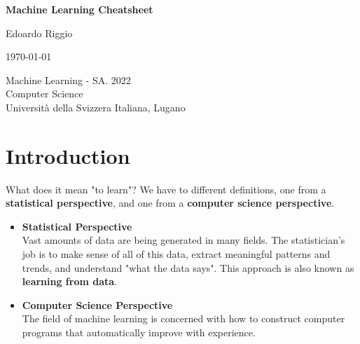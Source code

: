 \documentclass{article}
\begin{document}
\begin{titlepage}
    \begin{center}
        \vspace*{1cm}
        
        \Huge
        \textbf{Machine Learning Cheatsheet}
        
        \vspace{0.5cm}
        \LARGE
        
        \vspace{.5cm}
        
        Edoardo Riggio
   		  \vspace{1.5cm}
       
        \vfill
        
        \today
        
        \vspace{.8cm}
          \Large
          Machine Learning - SA. 2022 \\
        Computer Science\\
        Universit\`{a} della Svizzera Italiana, Lugano\\
        
    \end{center}
\end{titlepage}

\tableofcontents

\newpage

\section{Introduction}
What does it mean "to learn"? We have to different definitions, one from a \textbf{statistical perspective}, and one from a \textbf{computer science perspective}.

\begin{itemize}
	\item \textbf{Statistical Perspective}
	\vspace{.2cm} \\
	Vast amounts of data are being generated in many fields. The statistician's job is to make sense of all of this data, extract meaningful patterns and trends, and understand "what the data says". This approach is also known as \textbf{learning from data}.
	
	\item \textbf{Computer Science Perspective}
	\vspace{.2cm} \\
	The field of machine learning is concerned with how to construct computer programs that automatically improve with experience.
\end{itemize}
\end{document}
